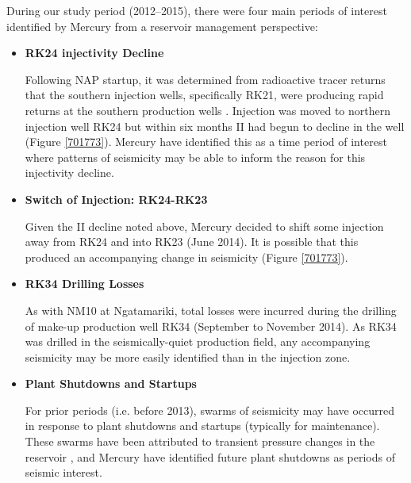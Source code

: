 During our study period (2012--2015), there were four main periods of interest identified by Mercury from a reservoir management perspective:
\begin{itemize}
  \item{\textbf{RK24 \Gls{injectivity} Decline}}
  
  Following \acrshort{NAP} startup, it was determined from radioactive tracer returns that the southern injection wells, specifically RK21, were producing rapid returns at the southern production wells \citep{addison2015rotokawa}. Injection was moved to northern injection well RK24 but within six months \acrshort{II} had begun to decline in the well (Figure \ref{701773}). Mercury have identified this as a time period of interest where patterns of seismicity may be able to inform the reason for this \gls{injectivity} decline.
  \item{\textbf{Switch of Injection: RK24-RK23}}
  
  Given the \acrshort{II} decline noted above, Mercury decided to shift some injection away from RK24 and into RK23 (June 2014). It is possible that this produced an accompanying change in seismicity (Figure \ref{701773}).
  \item{\textbf{RK34 Drilling Losses}}
  
  As with NM10 at Ngatamariki, total losses were incurred during the drilling of make-up production well RK34 (September to November 2014). As RK34 was drilled in the seismically-quiet production field, any accompanying seismicity may be more easily identified than in the injection zone.
  \item{\textbf{Plant Shutdowns and Startups}}
  
  For prior periods (i.e. before 2013), swarms of seismicity may have occurred in response to plant shutdowns and startups (typically for maintenance). These swarms have been attributed to transient pressure changes in the reservoir \citep{Sherburn_2015}, and Mercury have identified future plant shutdowns as periods of seismic interest.
\end{itemize}

